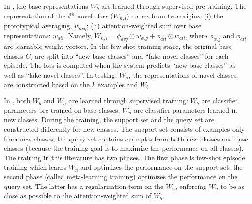 \documentclass[11pt]{article}
\begin{document}
In \citet{DBLPGidarisK18}, the base representations $W_b$ are learned through supervised pre-training. The representation of the $i^{th}$ novel class ($W_{n,i}$) comes from two origins: (i) the prototypical averaging, $w_{avg}$; (ii) attention-weighted sum over base representations: $w_{att}$. Namely,  $W_{n,i}=\phi_{avg}\odot w_{avg}+\phi_{att}\odot w_{att}$, where $\phi_{avg}$ and $\phi_{att}$ are learnable weight vectors. In the few-shot training stage, the original base classes $C_b$ are split into ``new base classes'' and ``fake novel classes'' for each episode. The loss is computed when the system predicts ``new base classes'' as well as ``fake novel classes''. In testing, $W_n$, the representations of novel classes, are constructed based on the $k$ examples and $W_b$.


In \citet{DBLPRenLFZ19}, both $W_b$ and $W_n$ are learned through supervised training:  $W_b$ are classifier parameters pre-trained on base classes, $W_n$ are classifier parameters learned in new classes.
During the training, the support set and the query set are constructed differently for new classes.
The support set consists of examples only from new classes; the query set contains examples from both new classes and base classes (because the training goal is to maximize the performance on all classes). The training in this literature has two phases. The first phase is few-shot episode training which learns $W_n$ and optimizes the performance on the support set; the second phase (called meta-learning training) optimizes the performance on the query set. The latter has a regularization term on the $W_n$, enforcing $W_n$ to be as close as possible to the attention-weighted sum of $W_b$.
\end{document}
